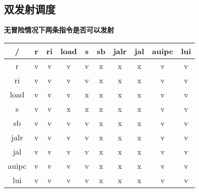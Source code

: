 \documentclass{article}
\begin{document}
        \subsection{双发射调度}
        \begin{center}
        \par{\bf 无冒险情况下两条指令是否可以发射}
        \par{}
        \begin{tabular}{|c|c|c|c|c|c|c|c|c|c|}
            \hline
                / & r & ri & load & s & sb & jalr & jal & auipc & lui \\
            \hline
                r & v & v & v & v & x & x & x & v & v \\
            \hline
                ri & v & v & v & v & x & x & x & v & v \\
            \hline
                load & v & v & v & x & x & x & x & v & v \\
            \hline
                s & v & v & x & x & x & x & x & v & v \\
            \hline
                sb & v & v & v & v & x & x & x & v & v \\
            \hline
                jalr & v & v & v & v & x & x & x & v & v \\
            \hline
                jal & v & v & v & v & x & x & x & v & v \\
            \hline
                auipc & v & v & v & v & x & x & x & v & v \\
            \hline
                lui & v & v & v & v & x & x & x & v & v \\
            \hline
        \end{tabular}


\end{center}
\end{document}
